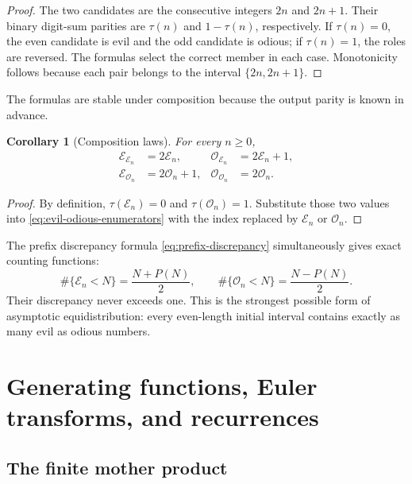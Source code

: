 \documentclass[11pt,oneside]{article}
\newtheorem{corollary}[theorem]{Corollary}
\theoremstyle{definition}
\theoremstyle{remark}
\begin{document}
\begin{proof}
The two candidates are the consecutive integers \(2n\) and \(2n+1\).  Their
binary digit-sum parities are \(\tau(n)\) and \(1-\tau(n)\), respectively.
If \(\tau(n)=0\), the even candidate is evil and the odd candidate is odious;
if \(\tau(n)=1\), the roles are reversed.  The formulas select the correct
member in each case.  Monotonicity follows because each pair belongs to the
interval \(\{2n,2n+1\}\).
\end{proof}

The formulas are stable under composition because the output parity is known
in advance.

\begin{corollary}[Composition laws]
For every \(n\ge0\),
\begin{align}
  \mathcal E_{\mathcal E_n}&=2\mathcal E_n,
  &\mathcal O_{\mathcal E_n}&=2\mathcal E_n+1,
  \label{eq:EE-OE}\\
  \mathcal E_{\mathcal O_n}&=2\mathcal O_n+1,
  &\mathcal O_{\mathcal O_n}&=2\mathcal O_n.
  \label{eq:EO-OO}
\end{align}
\end{corollary}

\begin{proof}
By definition, \(\tau(\mathcal E_n)=0\) and
\(\tau(\mathcal O_n)=1\).  Substitute those two values into
\eqref{eq:evil-odious-enumerators} with the index replaced by
\(\mathcal E_n\) or \(\mathcal O_n\).
\end{proof}

The prefix discrepancy formula \eqref{eq:prefix-discrepancy} simultaneously
gives exact counting functions:
\begin{equation}
  \#\{\mathcal E_n<N\}=\frac{N+P(N)}2,
  \qquad
  \#\{\mathcal O_n<N\}=\frac{N-P(N)}2.
  \label{eq:evil-odious-counting}
\end{equation}
Their discrepancy never exceeds one.  This is the strongest possible form of
asymptotic equidistribution: every even-length initial interval contains
exactly as many evil as odious numbers.

\section{Generating functions, Euler transforms, and recurrences}
\label{sec:generating}

\subsection{The finite mother product}
\end{document}
